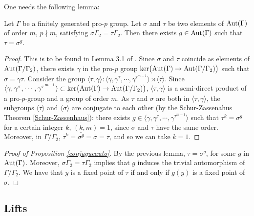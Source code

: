 \documentclass[12pt,a4paper,twoside,english]{smfart}
\def\Aut{{\rm Aut}}
\def\ker{{\rm ker}}
\begin{document}
 One needs  the following lemma:
 
 \begin{lemm}\label{autoexterieur}  Let $\Gamma$ be a finitely generated pro-$p$ group.
  Let  $\sigma$ and $\tau$ be two elements of  $\Aut(\Gamma)$ of order $m$, $p \nmid m$, satisfying $\sigma \Gamma_2= \tau\Gamma_2$.
Then there exists $g \in \Aut(\Gamma)$ such that
  $\tau=\sigma^g$.
 \end{lemm}

 \begin{proof} This is to be found in Lemma 3.1 of \cite{HR}.  Since 
  $\sigma$ and  $\tau$ coincide as elements of $\Aut(\Gamma/\Gamma_2)$, there exists $\gamma$ in the pro-$p$ group $\ker\big(\Aut(\Gamma)\rightarrow \Aut(\Gamma/\Gamma_2)\big)$ such that
 $\sigma=\gamma \tau$. 
Consider the group $\langle\tau, \gamma\rangle :\langle \gamma, \gamma^{\tau}, \cdots, \gamma^{\tau^{m-1}}\rangle\rtimes \langle\tau\rangle$. 
Since $\langle \gamma, \gamma^{\tau}, \cdots, \gamma^{\tau^{m-1}}\rangle \subset
\ker\big(\Aut(\Gamma)\rightarrow \Aut(\Gamma/\Gamma_2)\big) $, $\langle\tau,\gamma\rangle$ 
is a semi-direct product
of a pro-$p$-group and a group of order $m$. As $\tau$ and $\sigma$ are both in $\langle\tau,\gamma\rangle$, the subgroups $\langle\tau\rangle$ and $\langle\sigma\rangle$ are conjugate to each other (by the Schur-Zassenahus Theorem \ref{Schur-Zassenhaus}):
 there exists $g\in \langle \gamma, \gamma^{\tau}, \cdots, \gamma^{\tau^{m-1}}\rangle$
such that $\tau^k=\sigma^g$ for a certain integer $k$, $(k,m)=1$, since $\sigma$ and  $\tau$ have the same order.  Moreover, in  $\Gamma/\Gamma_2$, $\overline{\tau}^k=\overline{\sigma^g}=\overline{\sigma}=\overline{\tau}$,
 and so we can take $k=1$.
  \end{proof}

\begin{proof}[Proof of Proposition \ref{conjugueauto}]
  By the previous lemma, $\tau=\sigma^g$, for some $g$ in $\Aut(\Gamma)$.  Moreover, $\sigma\Gamma_2=\tau\Gamma_2$ 
  implies that $g$ induces the trivial automorphism of $\Gamma/\Gamma_2$.  
  We have that $y$ is a fixed point of $\tau$ if and only if $g(y)$ is a fixed point of $\sigma$.
 \end{proof}
 
  
  
 
  \subsection{Lifts}
  
\end{document}

